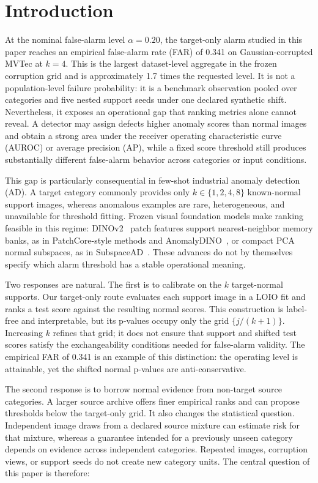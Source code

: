 \section{Introduction}\label{sec:introduction}
At the nominal false-alarm level $\alpha=0.20$, the target-only alarm studied in this paper reaches an empirical false-alarm rate (FAR) of 0.341 on Gaussian-corrupted MVTec at $k=4$. This is the largest dataset-level aggregate in the frozen corruption grid and is approximately 1.7 times the requested level. It is not a population-level failure probability: it is a benchmark observation pooled over categories and five nested support seeds under one declared synthetic shift. Nevertheless, it exposes an operational gap that ranking metrics alone cannot reveal. A detector may assign defects higher anomaly scores than normal images and obtain a strong area under the receiver operating characteristic curve (AUROC) or average precision (AP), while a fixed score threshold still produces substantially different false-alarm behavior across categories or input conditions.

This gap is particularly consequential in few-shot industrial anomaly detection (AD). A target category commonly provides only $k\in\{1,2,4,8\}$ known-normal support images, whereas anomalous examples are rare, heterogeneous, and unavailable for threshold fitting. Frozen visual foundation models make ranking feasible in this regime: DINOv2~\cite{oquab2024dinov2} patch features support nearest-neighbor memory banks, as in PatchCore-style methods and AnomalyDINO~\cite{roth2022towards,damm2025anomalydino}, or compact PCA normal subspaces, as in SubspaceAD~\cite{subspacead2026}. These advances do not by themselves specify which alarm threshold has a stable operational meaning.

Two responses are natural. The first is to calibrate on the $k$ target-normal supports. Our target-only route evaluates each support image in a LOIO fit and ranks a test score against the resulting normal scores. This construction is label-free and interpretable, but its p-values occupy only the grid $\{j/(k+1)\}$. Increasing $k$ refines that grid; it does not ensure that support and shifted test scores satisfy the exchangeability conditions needed for false-alarm validity. The empirical FAR of 0.341 is an example of this distinction: the operating level is attainable, yet the shifted normal p-values are anti-conservative.

The second response is to borrow normal evidence from non-target source categories. A larger source archive offers finer empirical ranks and can propose thresholds below the target-only grid. It also changes the statistical question. Independent image draws from a declared source mixture can estimate risk for that mixture, whereas a guarantee intended for a previously unseen category depends on evidence across independent categories. Repeated images, corruption views, or support seeds do not create new category units. The central question of this paper is therefore:

